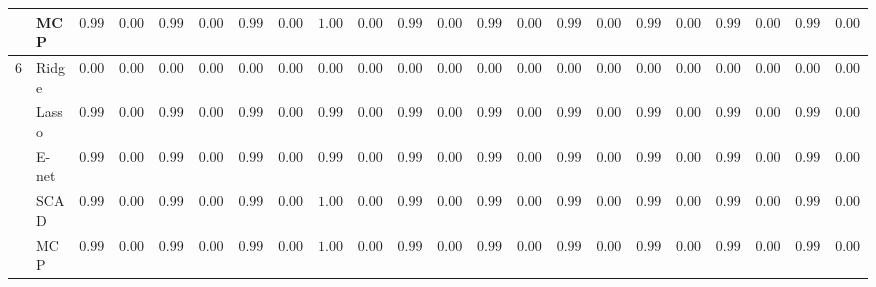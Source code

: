 \begin{tabular}{p{0.2cm}p{1cm}|p{0.6cm}p{0.6cm}|p{0.6cm}p{0.6cm}p{0.6cm}p{0.6cm}p{0.6cm}p{0.6cm}|p{0.6cm}p{0.6cm}p{0.6cm}p{0.6cm}p{0.6cm}p{0.6cm}|p{0.6cm}p{0.6cm}p{0.6cm}p{0.6cm}p{0.6cm}p{0.6cm}}
 & MCP  & $0.9987$ & $0.0016$ & $0.9987$ & $0.0016$ & $0.9996$ & $0.0007$ & $1.0000$ & $0.0000$ & $0.9986$ & $0.0021$ & $0.9979$ & $0.0021$ & $0.9977$ & $0.0022$ & $0.9983$ & $0.0020$ & $0.9987$ & $0.0014$ & $0.9995$ & $0.0007$ \\\hline
6 & Ridge  & $0.0000$ & $0.0000$ & $0.0000$ & $0.0000$ & $0.0000$ & $0.0000$ & $0.0000$ & $0.0000$ & $0.0000$ & $0.0000$ & $0.0000$ & $0.0000$ & $0.0000$ & $0.0000$ & $0.0000$ & $0.0000$ & $0.0000$ & $0.0000$ & $0.0000$ & $0.0000$ \\
 & Lasso  & $0.9989$ & $0.0017$ & $0.9974$ & $0.0022$ & $0.9953$ & $0.0028$ & $0.9957$ & $0.0023$ & $0.9986$ & $0.0022$ & $0.9971$ & $0.0033$ & $0.9996$ & $0.0026$ & $0.9985$ & $0.0019$ & $0.9966$ & $0.0028$ & $0.9928$ & $0.0049$ \\
 & E-net  & $0.9984$ & $0.0021$ & $0.9961$ & $0.0027$ & $0.9939$ & $0.0031$ & $0.9945$ & $0.0024$ & $0.9979$ & $0.0026$ & $0.9961$ & $0.0040$ & $0.9991$ & $0.0027$ & $0.9978$ & $0.0025$ & $0.9952$ & $0.0032$ & $0.9920$ & $0.0047$ \\
 & SCAD  & $0.9943$ & $0.0051$ & $0.9956$ & $0.0037$ & $0.9979$ & $0.0020$ & $1.0000$ & $0.0000$ & $0.9947$ & $0.0047$ & $0.9934$ & $0.0047$ & $0.9954$ & $0.0040$ & $0.9945$ & $0.0048$ & $0.9964$ & $0.0028$ & $0.9990$ & $0.0012$ \\
 & MCP  & $0.9987$ & $0.0016$ & $0.9987$ & $0.0016$ & $0.9996$ & $0.0007$ & $1.0000$ & $0.0000$ & $0.9984$ & $0.0021$ & $0.9979$ & $0.0021$ & $0.9977$ & $0.0022$ & $0.9983$ & $0.0020$ & $0.9987$ & $0.0014$ & $0.9995$ & $0.0007$ \\
\hline 
\end{tabular}

